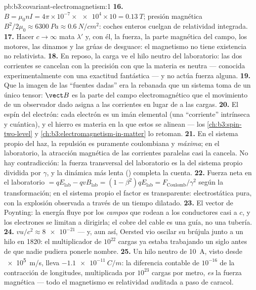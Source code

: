 \begin{solution}{pb:b3:covariant-electromagnetism:1}
\textbf{16.} $B = \mu_0nI = 4\pi\times10^{-7} \times \num{e4} \times
10 = \qty{0.13}{T}$; presión magnética $B^2/2\mu_0 \approx
\qty{6300}{Pa} \approx \qty{0.6}{N/cm^2}$: coches enteros cuelgan de
relatividad integrada.
\textbf{17.} Hacer $c \to \infty$ mata $\lambda'$ y, con él, la fuerza, la
parte magnética del campo, los motores, las dinamos y las grúas de desguace:
el magnetismo no tiene existencia no relativista.
\textbf{18.} En reposo, la carga ve el hilo neutro del laboratorio: las dos
corrientes se cancelan con la precisión con que la materia es neutra ---
conocida experimentalmente con una exactitud fantástica --- y no actúa
fuerza alguna.
\textbf{19.} Que la imagen de las ``fuentes dadas'' era la rebanada que un
sistema toma de un único tensor: $\vect B$ es la parte del campo
electromagnético que el movimiento de un observador dado asigna a las
corrientes en lugar de a las cargas.
\textbf{20.} El espín del electrón: cada electrón es un imán elemental (una
``corriente'' intrínseca y cuántica), y el hierro es materia en la que estos
se alinean --- los \cref{ch:b3:spin-two-level} y
\cref{ch:b3:electromagnetism-in-matter} lo retoman.
\textbf{21.} En el sistema propio del haz, la repulsión es puramente
coulombiana y \emph{máxima}; en el laboratorio, la atracción magnética de
las corrientes paralelas casi la cancela. No hay contradicción: la fuerza
transversal del laboratorio es la del sistema propio dividida por $\gamma$,
y la dinámica más lenta () completa la cuenta.
\textbf{22.} Fuerza neta en el laboratorio $= qE_{\text{lab}} - qvB_{\text{lab}} =
(1 - \beta^2)qE_{\text{lab}} = F_{\text{Coulomb}}/\gamma^2$ según la
transformación; en el sistema propio el factor es transparente:
electrostática pura, con la explosión observada a través de un tiempo
dilatado.
\textbf{23.} El vector de Poynting: la energía fluye por los \emph{campos}
que rodean a los conductores casi a $c$, y los electrones se limitan a
dirigirla; el cobre del cable es una guía, no una tubería.
\textbf{24.} $vu/c^2 \approx \num{8e-21}$ --- y, aun así, Oersted vio
oscilar su brújula junto a un hilo en 1820: el multiplicador de
$10^{22}$ cargas ya estaba trabajando un siglo antes de que nadie pudiera
ponerle nombre.
\textbf{25.} Un hilo neutro de \qty{10}{A}, visto desde \qty{e5}{m/s},
lleva $\qty{-1.1e-11}{C/m}$: la diferencia contable de $10^{-16}$ de la
contracción de longitudes, multiplicada por $10^{23}$ cargas por metro,
\emph{es} la fuerza magnética --- todo el magnetismo es relatividad
auditada a paso de caracol.
\end{solution}
